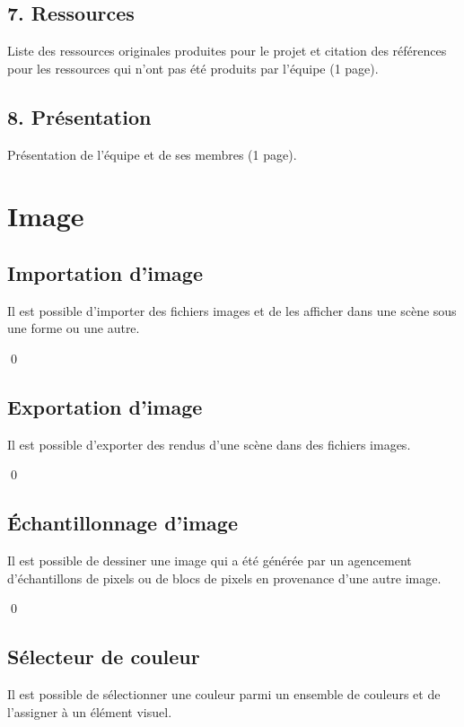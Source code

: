 \documentclass[12pt]{article}
\newcommand{\state}{\noindent}
\begin{document}
\subsection*{7. Ressources}

\state
Liste des ressources originales produites pour le projet et citation des références pour les ressources qui n'ont pas été produits par l'équipe (1 page).

\subsection*{8. Présentation}

\state
Présentation de l'équipe et de ses membres (1 page).

\pagebreak

\section{Image}

\subsection{Importation d'image}

\state
Il est possible d'importer des fichiers images et de les afficher dans une scène sous une forme ou une autre.

\qed

\subsection{Exportation d'image}

\state
Il est possible d'exporter des rendus d'une scène dans des fichiers images.

\qed

\subsection{Échantillonnage d'image}

\state
Il est possible de dessiner une image qui a été générée par un agencement d'échantillons de pixels ou de blocs de pixels en provenance d'une autre image.

\qed

\subsection{Sélecteur de couleur}

\state
Il est possible de sélectionner une couleur parmi un ensemble de couleurs et de l'assigner à un élément visuel.
\end{document}
